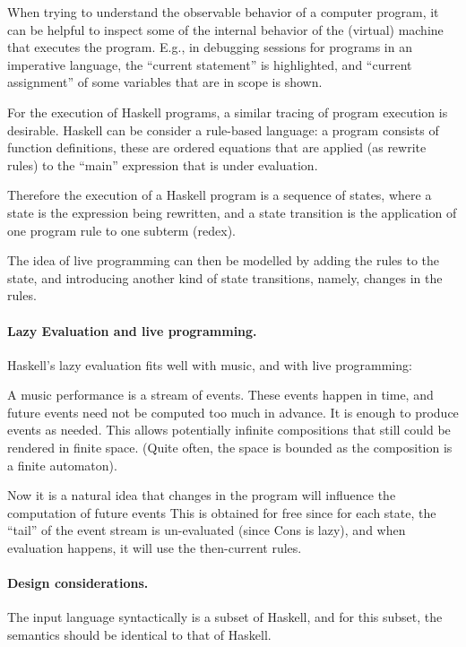 \documentclass[a4paper]{easychair}
\begin{document}
When trying to understand the observable behavior of a computer program,
it can be helpful to inspect some of the internal behavior
of the (virtual) machine that executes the program.
E.g., in debugging sessions for programs in an imperative language,
the ``current statement'' is highlighted, and ``current assignment''
of some variables that are in scope is shown.

For the execution of Haskell programs, 
a similar tracing of program execution is desirable.
Haskell can be consider a rule-based language:
a program consists of function definitions,
these are ordered equations that are applied
(as rewrite rules) to the ``main'' expression that is under evaluation.

Therefore the execution of a Haskell program is a sequence of states,
where a state is the expression being rewritten,
and a state transition is the application of one program rule
to one subterm (redex).

The idea of live programming can then be modelled by
adding the rules to the state, and introducing another kind of
state transitions, namely, changes in the rules.

\paragraph{Lazy Evaluation and live programming.}

Haskell's lazy evaluation fits well with music,
and with live programming:

A music performance is a stream of events.
These events happen in time, and future events need not be
computed too much in advance. It is enough to produce events as needed.
This allows potentially infinite compositions
that still could be rendered in finite space. 
(Quite often, the space is bounded as the composition is a finite automaton).

Now it is a natural idea that changes in the program
will influence the computation of future events
This is obtained for free since for each state,
the ``tail'' of the event stream is un-evaluated (since Cons is lazy),
and when evaluation happens, it will use the then-current rules.

\paragraph{Design considerations.}

The input language syntactically is a subset of Haskell,
and for this subset, the semantics should be identical to that of Haskell.
\end{document}
